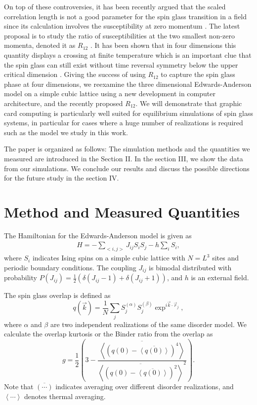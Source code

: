 On top of these controversies, it has been recently argued that the scaled correlation length 
is not a good parameter for the spin glass transition in a field since its calculation involves 
the susceptibility at zero momentum \cite{Leuzzi-etal-2008}.
The latest proposal is to study the ratio of susceptibilities at the 
two smallest non-zero momenta, denoted it as $R_{12}$ \cite{Banos-2012}. It has 
been shown that in four dimensions this quantity displays a crossing
at finite temperature which is an important clue that the spin glass can still 
exist without time reversal symmetry below the upper critical dimension \cite{Banos-2012}. 
Giving the success of using $R_{12}$ to capture the spin glass phase
at four dimensions, we reexamine the three dimensional Edwards-Anderson model on a simple cubic lattice using 
a new development in computer architecture, and the recently proposed $R_{12}$. 
We will demonstrate that graphic card computing is particularly well suited for 
equilibrium simulations of spin glass systems, in particular for cases where a huge number 
of realizations is required such as the model we study in this work. 

The paper is organized as follows: The simulation methods and the quantities we measured 
are introduced in the Section II. In the section III, we show the data from our simulations.
We conclude our results and discuss the possible directions for the future study in the
section IV.


\section{Method and Measured Quantities} 
The Hamiltonian for the Edwards-Anderson model is given as
\begin{eqnarray}
H=-\sum_{<i,j>} J_{ij} S_{i}S_{j}-h\sum_{i}S_{i},
\label{Hamiltonian}
\end{eqnarray}
where $S_i$ indicates Ising spins on a simple cubic lattice with $N=L^3$ sites and periodic boundary conditions. 
The coupling $J_{ij}$ is bimodal distributed with probability %
$P(J_{ij}) = \frac{1}{2}(\delta(J_{ij}-1) + \delta(J_{ij}+1))$, and $h$ is an external field.

The spin glass overlap is defined as 
\begin{equation}
  \label{eq:overlap}
  q(\vec{k})=\frac{1}{N}\sum_{j}S_j^{(\alpha)} S_j^{(\beta)}\exp^{i\vec{k} \cdot \vec{r}_j},
\end{equation}
where $\alpha$ and $\beta$ are two independent realizations of the same disorder model.
We calculate the overlap kurtosis or the Binder ratio from the overlap as \cite{Ciria-etal-1993,Marinari-etal-1998}
\begin{equation}
  \label{eq:binder}
  g=\frac{1}{2}\left(3-\frac{\overline{\left<\left(q(0)-\overline{\left<q(0)\right>}\right)^4\right>}}{\overline{\left<\left(q(0)-\overline{\left<q(0)\right>}\right)^2\right>}^2}\right).
\end{equation}
Note that $\overline{(\cdots)}$ indicates averaging over different disorder realizations,
and $\left<\cdots\right>$ denotes thermal averaging.


